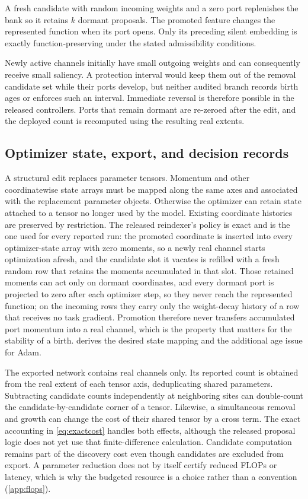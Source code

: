 \documentclass[10pt]{article}
\theoremstyle{paper}
\begin{document}
A fresh candidate with random incoming weights and a zero port replenishes the bank so it retains $k$ dormant proposals. The promoted feature changes the represented function when its port opens. Only its preceding silent embedding is exactly function-preserving under the stated admissibility conditions.

Newly active channels initially have small outgoing weights and can consequently receive small saliency. A protection interval would keep them out of the removal candidate set while their ports develop, but neither audited branch records birth ages or enforces such an interval. Immediate reversal is therefore possible in the released controllers. Ports that remain dormant are re-zeroed after the edit, and the deployed count is recomputed using the resulting real extents.

\subsection{Optimizer state, export, and decision records}
\label{app:optimizer-records}
A structural edit replaces parameter tensors. Momentum and other coordinatewise state arrays must be mapped along the same axes and associated with the replacement parameter objects. Otherwise the optimizer can retain state attached to a tensor no longer used by the model. Existing coordinate histories are preserved by restriction. The released reindexer's policy is exact and is the one used for every reported run: the promoted coordinate is inserted into every optimizer-state array with zero moments, so a newly real channel starts optimization afresh, and the candidate slot it vacates is refilled with a fresh random row that retains the moments accumulated in that slot. Those retained moments can act only on dormant coordinates, and every dormant port is projected to zero after each optimizer step, so they never reach the represented function; on the incoming rows they carry only the weight-decay history of a row that receives no task gradient. Promotion therefore never transfers accumulated port momentum into a real channel, which is the property that matters for the stability of a birth.  derives the desired state mapping and the additional age issue for Adam.

The exported network contains real channels only. Its reported count is obtained from the real extent of each tensor axis, deduplicating shared parameters. Subtracting candidate counts independently at neighboring sites can double-count the candidate-by-candidate corner of a tensor. Likewise, a simultaneous removal and growth can change the cost of their shared tensor by a cross term. The exact accounting in \cref{eq:exactcost} handles both effects, although the released proposal logic does not yet use that finite-difference calculation. Candidate computation remains part of the discovery cost even though candidates are excluded from export. A parameter reduction does not by itself certify reduced FLOPs or latency, which is why the budgeted resource is a choice rather than a convention (\cref{app:flops}).
\end{document}
